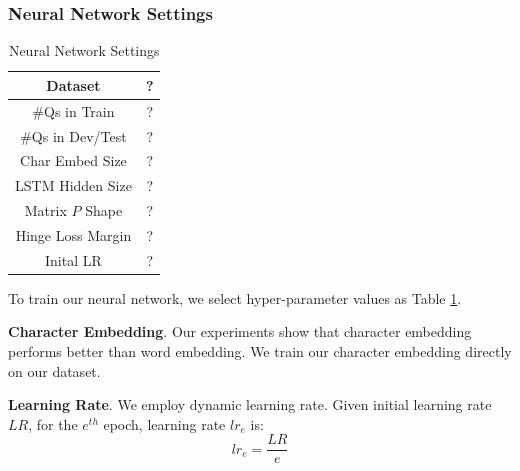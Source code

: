\documentclass[a4paper,10pt]{article}
\begin{document}
\subsubsection{Neural Network Settings}
\begin{table}[]
    \centering
    \begin{tabular}{c|c}
        \toprule[1pt]
         Dataset&? \\ \hline
         \#Qs in Train& ? \\ \hline
         \#Qs in Dev/Test& ? \\ \hline
         Char Embed Size& ? \\ \hline
         LSTM Hidden Size&? \\ \hline
         Matrix $P$ Shape&? \\ \hline Hinge Loss Margin&? \\ \hline
         Inital LR &? \\
        \bottomrule[1pt]
    \end{tabular}
    \caption{Neural Network Settings}
    \label{nnsetting}
\end{table}
\par To train our neural network, we select hyper-parameter values as Table \ref{nnsetting}.
\par \textbf{Character Embedding}. Our experiments show that character embedding performs better than word embedding. We train our character embedding directly on our dataset.
\par \textbf{Learning Rate}. We employ dynamic learning rate. Given initial learning rate $LR$, for the $e^{th}$ epoch, learning rate $lr_e$ is:
\begin{equation}
    lr_e = \frac{LR}{e}
\end{equation}
\end{document}

